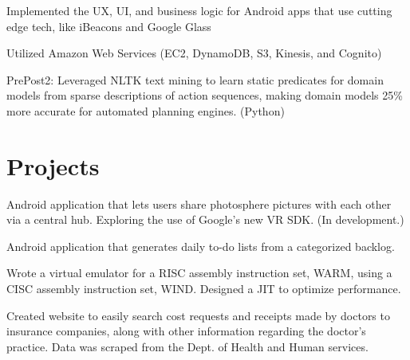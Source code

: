 \documentclass[]{deedy-resume-openfont}
\begin{document}
\begin{minipage}[t]{0.66\textwidth}
\begin{tightemize}
\item Implemented the UX, UI, and business logic for Android apps that use cutting edge tech, like iBeacons and Google Glass

\item Utilized Amazon Web Services (EC2, DynamoDB, S3, Kinesis, and Cognito)
\end{tightemize}
\sectionsep

\begin{tightemize}
\item PrePost2: Leveraged NLTK text mining to learn static predicates for domain models from sparse descriptions of action sequences, making domain models 25\% more accurate for automated planning engines. (Python)
\end{tightemize}
\sectionsep



\section{Projects}

\begin{tightemize}
\item Android application that lets users share photosphere pictures with each other via a central hub. Exploring the use of Google's new VR SDK. (In development.)
\end{tightemize}
\sectionsep

\begin{tightemize}
\item Android application that generates daily to-do lists from a categorized backlog.
\end{tightemize}
\sectionsep


\begin{tightemize}
\item Wrote a virtual emulator for a RISC assembly instruction set, WARM, using a CISC assembly instruction set, WIND. Designed a JIT to optimize performance.
\end{tightemize}
\sectionsep

\begin{tightemize}
\item Created website to easily search cost requests and receipts made by doctors to insurance companies, along with other information regarding the doctor's practice. Data was scraped from the Dept. of Health and Human services.
\end{tightemize}
\sectionsep

\end{minipage} 
\end{document}
